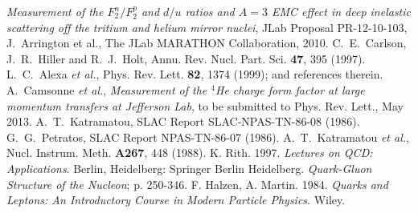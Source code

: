 

\vskip-0.6in
 {\it Measurement of the $F_2^n/F_2^p$ and $d/u$ ratios and $A=3$ EMC
effect in deep inelastic scattering off the tritium and helium mirror nuclei},
JLab Proposal PR-12-10-103, J.~Arrington et al., The JLab MARATHON Collaboration, 2010.
 C.~E.~Carlson, J.~R.~Hiller and R.~J.~Holt, Annu. Rev. Nucl.
               Part. Sci. {\bf 47}, 395 (1997).
 L.~C.~Alexa {\it et al.}, Phys. Rev. Lett. {\bf 82},
               1374 (1999); and references therein.
 A.~Camsonne {\it et al.}, {\it Measurement of the $^4$He charge
               form factor at large momentum transfers at Jefferson Lab}, to be
               submitted to Phys. Rev. Lett., May 2013.
 A.~T.~Katramatou, SLAC Report SLAC-NPAS-TN-86-08 (1986).      
 G.~G.~Petratos, SLAC Report NPAS-TN-86-07 (1986).
 A.~T.~Katramatou {\it et al.},
               Nucl. Instrum. Meth. {\bf A267}, 448 (1988).
 K. Rith. 1997. \textit{Lectures on QCD: Applications}. Berlin, Heidelberg: Springer Berlin Heidelberg. \textit{Quark-Gluon Structure of the Nucleon}; p. 250-346.
 F. Halzen, A. Martin. 1984. \textit{Quarks and Leptons: An Introductory Course in Modern Particle Physics}. Wiley.
               

         
               



